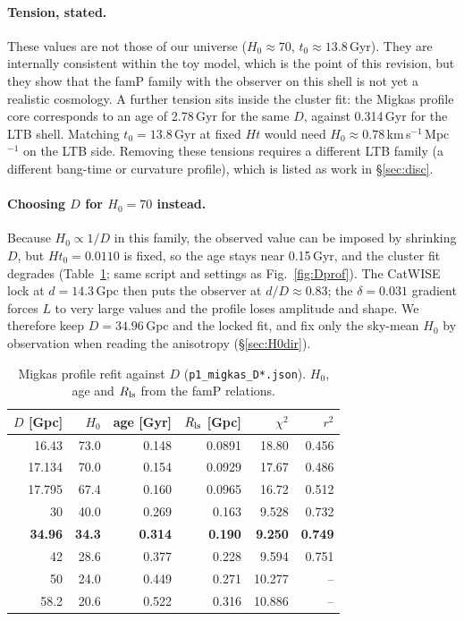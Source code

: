 \documentclass[11pt]{article}
\begin{document}
\paragraph{Tension, stated.} These values are not those of our universe ($H_0\approx70$, $t_0\approx13.8$\,Gyr). They are internally consistent within the toy model, which is the point of this revision, but they show that the famP family with the observer on this shell is not yet a realistic cosmology. A further tension sits inside the cluster fit: the Migkas profile core corresponds to an age of 2.78\,Gyr for the same $D$, against 0.314\,Gyr for the LTB shell. Matching $t_0=13.8$\,Gyr at fixed $Ht$ would need $H_0\approx0.78$\,km\,s$^{-1}$\,Mpc$^{-1}$ on the LTB side. Removing these tensions requires a different LTB family (a different bang-time or curvature profile), which is listed as work in \S\ref{sec:disc}.

\paragraph{Choosing $D$ for $H_0=70$ instead.} Because $H_0\propto1/D$ in this family, the observed value can be imposed by shrinking $D$, but $Ht_0=0.0110$ is fixed, so the age stays near 0.15\,Gyr, and the cluster fit degrades (Table~\ref{tab:Dscan}; same script and settings as Fig.~\ref{fig:Dprof}). The CatWISE lock at $d=14.3$\,Gpc then puts the observer at $d/D\approx0.83$; the $\delta=0.031$ gradient forces $L$ to very large values and the profile loses amplitude and shape. We therefore keep $D=34.96$\,Gpc and the locked fit, and fix only the sky-mean $H_0$ by observation when reading the anisotropy (\S\ref{sec:H0dir}).
\begin{table}[!htb]\centering\small\caption{Migkas profile refit against $D$ (\texttt{p1\_migkas\_D*.json}). $H_0$, age and $R_{\rm ls}$ from the famP relations.}\label{tab:Dscan}
\begin{tabular}{rrrrrr}\toprule
$D$ [Gpc] & $H_0$ & age [Gyr] & $R_{\rm ls}$ [Gpc] & $\chi^2$ & $r^2$\\\midrule
16.43 & 73.0 & 0.148 & 0.0891 & 18.80 & 0.456\\
17.134 & 70.0 & 0.154 & 0.0929 & 17.67 & 0.486\\
17.795 & 67.4 & 0.160 & 0.0965 & 16.72 & 0.512\\
30 & 40.0 & 0.269 & 0.163 & 9.528 & 0.732\\
\textbf{34.96} & \textbf{34.3} & \textbf{0.314} & \textbf{0.190} & \textbf{9.250} & \textbf{0.749}\\
42 & 28.6 & 0.377 & 0.228 & 9.594 & 0.751\\
50 & 24.0 & 0.449 & 0.271 & 10.277 & --\\
58.2 & 20.6 & 0.522 & 0.316 & 10.886 & --\\\bottomrule
\end{tabular}\end{table}
\end{document}
